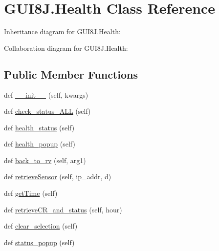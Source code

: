 \hypertarget{classGUI8J_1_1Health}{}\section{G\+U\+I8\+J.\+Health Class Reference}
\label{classGUI8J_1_1Health}


Inheritance diagram for G\+U\+I8\+J.\+Health\+:


Collaboration diagram for G\+U\+I8\+J.\+Health\+:
\subsection*{Public Member Functions}
\begin{DoxyCompactItemize}
\item 
def \hyperlink{classGUI8J_1_1Health_a6a1d62107161762df7294f37363cc3d0}{\+\_\+\+\_\+init\+\_\+\+\_\+} (self, kwargs)
\item 
def \hyperlink{classGUI8J_1_1Health_ae6f9ce7f00cf508b5265d514c83b190e}{check\+\_\+status\+\_\+\+A\+LL} (self)
\item 
def \hyperlink{classGUI8J_1_1Health_abe7fdc17fa8c4775f8d0a003895639d2}{health\+\_\+status} (self)
\item 
def \hyperlink{classGUI8J_1_1Health_ad3faaa369c1ef2c9a56e3e1d435c7fc2}{health\+\_\+popup} (self)
\item 
def \hyperlink{classGUI8J_1_1Health_a163b14e031bd548afa77530c64ebb479}{back\+\_\+to\+\_\+rv} (self, arg1)
\item 
def \hyperlink{classGUI8J_1_1Health_a52bba86fbebd0666cad9f1e1cfaf153f}{retrieve\+Sensor} (self, ip\+\_\+addr, d)
\item 
def \hyperlink{classGUI8J_1_1Health_a0c31bade8c2f9f1d5fa2321c12337466}{get\+Time} (self)
\item 
def \hyperlink{classGUI8J_1_1Health_ab2063827790ff6e6e1202a284c773ba4}{retrieve\+C\+R\+\_\+and\+\_\+status} (self, hour)
\item 
def \hyperlink{classGUI8J_1_1Health_a59855385f1bd944448ec71756e391cee}{clear\+\_\+selection} (self)
\item 
def \hyperlink{classGUI8J_1_1Health_a72e5243684cdfdfff0b7b7262dddb6d5}{status\+\_\+popup} (self)
\end{DoxyCompactItemize}
